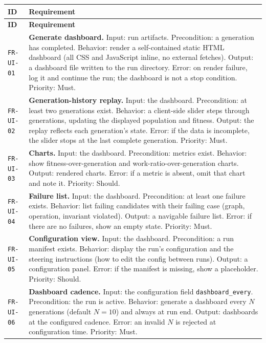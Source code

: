 \documentclass[12pt,a4paper]{article}
\begin{document}
\begin{longtable}{@{}p{2.2cm}p{10.6cm}@{}}
\toprule
\textbf{ID} & \textbf{Requirement} \\
\midrule
\endfirsthead
\toprule
\textbf{ID} & \textbf{Requirement} \\
\midrule
\endhead
\bottomrule
\endfoot

\texttt{FR-UI-01} & \textbf{Generate dashboard.} Input: run artifacts. Precondition: a generation has completed. Behavior: render a self-contained static HTML dashboard (all CSS and JavaScript inline, no external fetches). Output: a dashboard file written to the run directory. Error: on render failure, log it and continue the run; the dashboard is not a stop condition. Priority: Must. \\
\addlinespace[2pt]

\texttt{FR-UI-02} & \textbf{Generation-history replay.} Input: the dashboard. Precondition: at least two generations exist. Behavior: a client-side slider steps through generations, updating the displayed population and fitness. Output: the replay reflects each generation's state. Error: if the data is incomplete, the slider stops at the last complete generation. Priority: Must. \\
\addlinespace[2pt]

\texttt{FR-UI-03} & \textbf{Charts.} Input: the dashboard. Precondition: metrics exist. Behavior: show fitness-over-generation and work-ratio-over-generation charts. Output: rendered charts. Error: if a metric is absent, omit that chart and note it. Priority: Should. \\
\addlinespace[2pt]

\texttt{FR-UI-04} & \textbf{Failure list.} Input: the dashboard. Precondition: at least one failure exists. Behavior: list failing candidates with their failing case (graph, operation, invariant violated). Output: a navigable failure list. Error: if there are no failures, show an empty state. Priority: Must. \\
\addlinespace[2pt]

\texttt{FR-UI-05} & \textbf{Configuration view.} Input: the dashboard. Precondition: a run manifest exists. Behavior: display the run's configuration and the steering instructions (how to edit the config between runs). Output: a configuration panel. Error: if the manifest is missing, show a placeholder. Priority: Should. \\
\addlinespace[2pt]

\texttt{FR-UI-06} & \textbf{Dashboard cadence.} Input: the configuration field \texttt{dashboard\_every}. Precondition: the run is active. Behavior: generate a dashboard every $N$ generations (default $N=10$) and always at run end. Output: dashboards at the configured cadence. Error: an invalid $N$ is rejected at configuration time. Priority: Must. \\
\bottomrule
\end{longtable}
\end{document}
